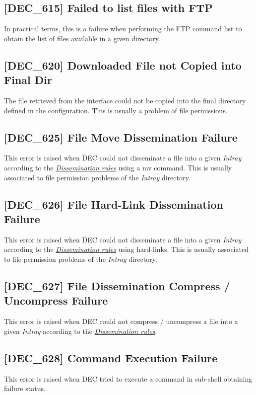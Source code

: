 \documentclass[dec_sum_main.tex]{subfiles}
\begin{document}
\label{DEC615}
\subsection{[DEC\_615] Failed to list files with FTP}
In practical terms, this is a failure when performing the FTP command list to obtain the list of files available in a given directory.

\subsection{[DEC\_620] Downloaded File not Copied into Final Dir}
\label{DEC620}
The file retrieved from the interface could not be copied into the final directory defined in the configuration. This is usually a problem of file permissions. 

\subsection{[DEC\_625] File Move Dissemination Failure}
\label{DEC625}
This error is raised when DEC could not disseminate a file into a given \textit{Intray} according to the \hyperref[Dissemination rules]{\textit{Dissemination rules}} using a mv command. This is usually associated to file permission problems of the \textit{Intray} directory.

\subsection{[DEC\_626] File Hard-Link Dissemination Failure}
\label{DEC626}
This error is raised when DEC could not disseminate a file into a given \textit{Intray} according to the \hyperref[Dissemination rules]{\textit{Dissemination rules}} using hard-links. This is usually associated to file permission problems of the \textit{Intray} directory.

\subsection{[DEC\_627] File Dissemination Compress / Uncompress Failure}
\label{DEC627}
This error is raised when DEC could not compress / uncompress a file into a given \textit{Intray} according to the \hyperref[Dissemination rules]{\textit{Dissemination rules}}.

\subsection{[DEC\_628] Command Execution Failure}
\label{DEC628}
This error is raised when DEC tried to execute a command in sub-shell obtaining failure status.
\end{document}
